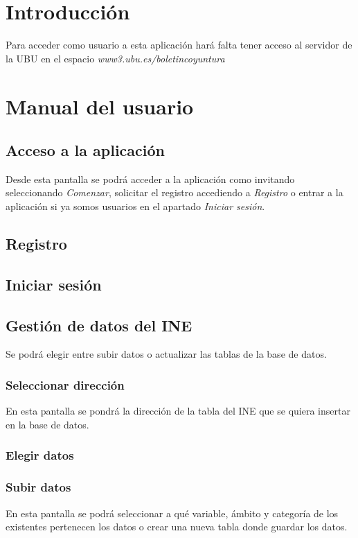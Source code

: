 \section{Introducción}
Para acceder como usuario a esta aplicación hará falta tener acceso al servidor de la UBU en el espacio \textit{www3.ubu.es/boletincoyuntura}
\section{Manual del usuario}
\subsection{Acceso a la aplicación}
Desde esta pantalla se podrá acceder a la aplicación como invitando seleccionando \textit{Comenzar}, solicitar el registro accediendo a \textit{Registro} o entrar a la aplicación si ya somos usuarios en el apartado \textit{Iniciar sesión}.\\
\subsection{Registro}
\subsection{Iniciar sesión}
\subsection{Gestión de datos del INE}
Se podrá elegir entre subir datos o actualizar las tablas de la base de datos.
\subsubsection{Seleccionar dirección}
En esta pantalla se pondrá la dirección de la tabla del INE que se quiera insertar en la base de datos.
\subsubsection{Elegir datos}
\subsubsection{Subir datos}
En esta pantalla se podrá seleccionar a qué variable, ámbito y categoría de los existentes pertenecen los datos o crear una nueva tabla donde guardar los datos.
